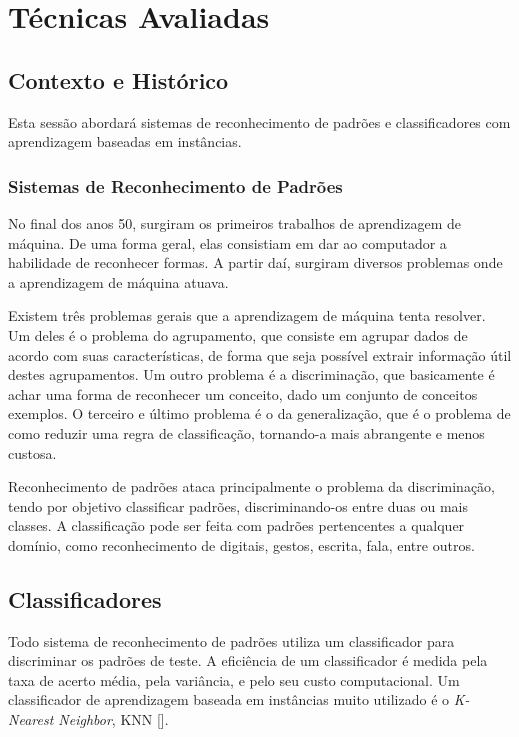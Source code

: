 \chapter{Técnicas Avaliadas}
\label{ch:ch2}

\section{Contexto e Histórico}
\label{sec:contexto}

Esta sessão abordará sistemas de reconhecimento de padrões e classificadores com aprendizagem baseadas em instâncias.

\subsection{Sistemas de Reconhecimento de Padrões}
\label{subsec:sistemas}

No final dos anos 50, surgiram os primeiros trabalhos de aprendizagem de máquina. De uma forma geral, elas consistiam em dar ao computador a habilidade de reconhecer formas. A partir daí, surgiram diversos problemas onde a aprendizagem de máquina atuava. 

Existem três problemas gerais que a aprendizagem de máquina tenta resolver. Um deles é o problema do agrupamento, que consiste em agrupar dados de acordo com suas características, de forma que seja possível extrair informação útil destes agrupamentos. Um outro problema é a discriminação, que basicamente é achar uma forma de reconhecer um conceito, dado um conjunto de conceitos exemplos. O terceiro e último problema é o da generalização, que é o problema de como reduzir uma regra de classificação, tornando-a mais abrangente e menos custosa.

Reconhecimento de padrões ataca principalmente o problema da discriminação, tendo por objetivo classificar padrões, discriminando-os entre duas ou mais classes. A classificação pode ser feita com padrões pertencentes a qualquer domínio, como reconhecimento de digitais, gestos, escrita, fala, entre outros.

\section{Classificadores}
\label{sec:classificadores}

Todo sistema de reconhecimento de padrões utiliza um classificador para discriminar os padrões de teste. A eficiência de um classificador é medida pela taxa de acerto média, pela variância, e pelo seu custo computacional. Um classificador de aprendizagem baseada em instâncias muito utilizado é o \textit{K-Nearest Neighbor}, KNN [\cite{knnrule:1969}]. 

